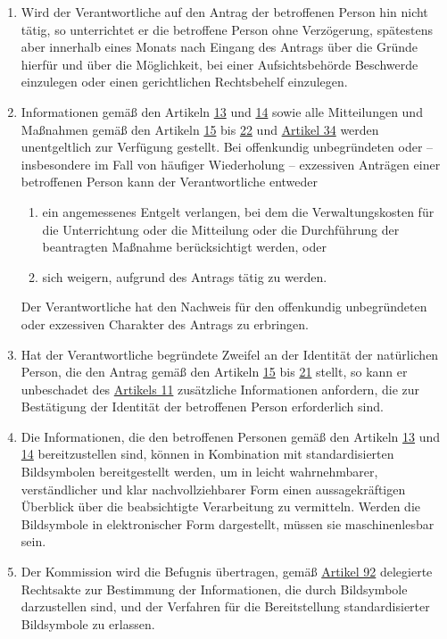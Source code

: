 \begin{enumerate}
  \item Wird der Verantwortliche auf den Antrag der betroffenen Person hin nicht tätig, so unterrichtet er die
   betroffene Person ohne Verzögerung, spätestens aber innerhalb eines Monats nach Eingang des Antrags über die Gründe
   hierfür und über die Möglichkeit, bei einer Aufsichtsbehörde Beschwerde einzulegen oder einen gerichtlichen
   Rechtsbehelf einzulegen.
  \label{itm:12-4}

  \item Informationen gemäß den Artikeln \hyperref[ch:13]{13} und \hyperref[ch:14]{14} sowie alle Mitteilungen und
   Maßnahmen gemäß den Artikeln \hyperref[ch:15]{15} bis \hyperref[ch:22]{22} und \hyperref[ch:34]{Artikel 34} werden
   unentgeltlich zur Verfügung gestellt. Bei offenkundig unbegründeten oder -- insbesondere im Fall von häufiger
   Wiederholung -- exzessiven Anträgen einer betroffenen Person kann der Verantwortliche entweder
  \label{itm:12-5}

  \begin{enumerate}
  
    \item ein angemessenes Entgelt verlangen, bei dem die Verwaltungskosten für die Unterrichtung oder die Mitteilung
     oder die Durchführung der beantragten Maßnahme berücksichtigt werden, oder
    \label{itm:12-5a}

    \item sich weigern, aufgrund des Antrags tätig zu werden.
    \label{itm:12-5b}

  \end{enumerate}

  Der Verantwortliche hat den Nachweis für den offenkundig unbegründeten oder exzessiven Charakter des Antrags zu
  erbringen.

  \item Hat der Verantwortliche begründete Zweifel an der Identität der natürlichen Person, die den Antrag gemäß den
   Artikeln \hyperref[ch:15]{15} bis \hyperref[ch:21]{21} stellt, so kann er unbeschadet des \hyperref[ch:11]
   {Artikels 11} zusätzliche Informationen anfordern, die zur Bestätigung der Identität der betroffenen Person
   erforderlich sind.
  \label{itm:12-6}

  \item Die Informationen, die den betroffenen Personen gemäß den Artikeln \hyperref[ch:13]{13} und \hyperref[ch:14]
   {14} bereitzustellen sind, können in Kombination mit standardisierten Bildsymbolen bereitgestellt werden, um in
   leicht wahrnehmbarer, verständlicher und klar nachvollziehbarer Form einen aussagekräftigen Überblick über die
   beabsichtigte Verarbeitung zu vermitteln. Werden die Bildsymbole in elektronischer Form dargestellt, müssen sie
   maschinenlesbar sein.
  \label{itm:12-7}

  \item Der Kommission wird die Befugnis übertragen, gemäß \hyperref[ch:92]{Artikel 92} delegierte Rechtsakte zur
   Bestimmung der Informationen, die durch Bildsymbole darzustellen sind, und der Verfahren für die Bereitstellung
   standardisierter Bildsymbole zu erlassen.
  \label{itm:12-8}

\end{enumerate}


